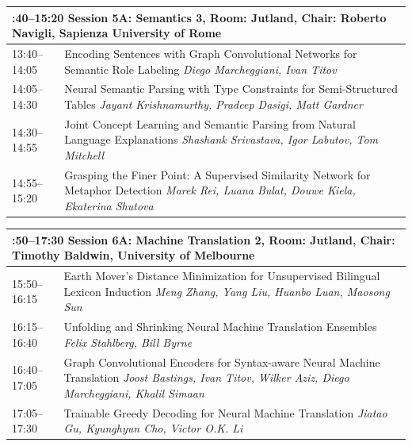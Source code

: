\documentclass{book}
\renewcommand{\large}{\fontsize{72}{80}\selectfont}
\renewcommand{\large}{\fontsize{82}{90}\selectfont}
\begin{document}
\begin{tabular}{p{20cm}p{70cm}}
  \multicolumn{2}{p{\textwidth}}{\bfseries\large 13:40--15:20 Session 5A: Semantics 3, Room:  Jutland, Chair:  Roberto Navigli, Sapienza University of Rome} \\\hline

    
    13:40--14:05
    &	Encoding Sentences with Graph Convolutional Networks for Semantic Role Labeling \newline 
    {\itshape Diego Marcheggiani, Ivan Titov} \\
    
    14:05--14:30
    &	Neural Semantic Parsing with Type Constraints for Semi-Structured Tables \newline 
    {\itshape Jayant Krishnamurthy, Pradeep Dasigi, Matt Gardner} \\
    
    14:30--14:55
    &	Joint Concept Learning and Semantic Parsing from Natural Language Explanations \newline 
    {\itshape Shashank Srivastava, Igor Labutov, Tom Mitchell} \\
    
    14:55--15:20
    &	Grasping the Finer Point: A Supervised Similarity Network for Metaphor Detection \newline 
    {\itshape Marek Rei, Luana Bulat, Douwe Kiela, Ekaterina Shutova} \\
    
\end{tabular}
\vspace*{\fill}

\begin{tabular}{p{20cm}p{70cm}}
  \multicolumn{2}{p{\textwidth}}{\bfseries\large 15:50--17:30 Session 6A: Machine Translation 2, Room:  Jutland, Chair:  Timothy Baldwin, University of Melbourne} \\\hline

    
    15:50--16:15
    &	Earth Mover's Distance Minimization for Unsupervised Bilingual Lexicon Induction \newline 
    {\itshape Meng Zhang, Yang Liu, Huanbo Luan, Maosong Sun} \\
    
    16:15--16:40
    &	Unfolding and Shrinking Neural Machine Translation Ensembles \newline 
    {\itshape Felix Stahlberg, Bill Byrne} \\
    
    16:40--17:05
    &	Graph Convolutional Encoders for Syntax-aware Neural Machine Translation \newline 
    {\itshape Joost Bastings, Ivan Titov, Wilker Aziz, Diego Marcheggiani, Khalil Simaan} \\
    
    17:05--17:30
    &	Trainable Greedy Decoding for Neural Machine Translation \newline 
    {\itshape Jiatao Gu, Kyunghyun Cho, Victor O.K. Li} \\
    
\end{tabular}
\vspace*{\fill}
\end{document}
